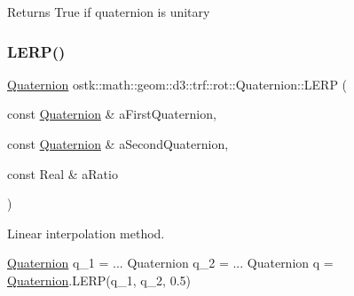 \begin{DoxyReturn}{Returns}
True if quaternion is unitary 
\end{DoxyReturn}
\mbox{\label{classostk_1_1math_1_1geom_1_1d3_1_1trf_1_1rot_1_1_quaternion_afdce957b3873db3f458a479db3b1cfd4}} 
\subsubsection{\texorpdfstring{L\+E\+R\+P()}{LERP()}}
{\footnotesize\ttfamily \hyperlink{classostk_1_1math_1_1geom_1_1d3_1_1trf_1_1rot_1_1_quaternion}{Quaternion} ostk\+::math\+::geom\+::d3\+::trf\+::rot\+::\+Quaternion\+::\+L\+E\+RP (\begin{DoxyParamCaption}\item[{const \hyperlink{classostk_1_1math_1_1geom_1_1d3_1_1trf_1_1rot_1_1_quaternion}{Quaternion} \&}]{a\+First\+Quaternion,  }\item[{const \hyperlink{classostk_1_1math_1_1geom_1_1d3_1_1trf_1_1rot_1_1_quaternion}{Quaternion} \&}]{a\+Second\+Quaternion,  }\item[{const Real \&}]{a\+Ratio }\end{DoxyParamCaption})\hspace{0.3cm}{\ttfamily [static]}}



Linear interpolation method. 


\begin{DoxyCode}
\hyperlink{classostk_1_1math_1_1geom_1_1d3_1_1trf_1_1rot_1_1_quaternion_ad9fd7d8eb5effb4d4e0394bbb5bb86dc}{Quaternion} q\_1 = ...
Quaternion q\_2 = ...
Quaternion q = \hyperlink{classostk_1_1math_1_1geom_1_1d3_1_1trf_1_1rot_1_1_quaternion_ad9fd7d8eb5effb4d4e0394bbb5bb86dc}{Quaternion}.LERP(q\_1, q\_2, 0.5)
\end{DoxyCode}



